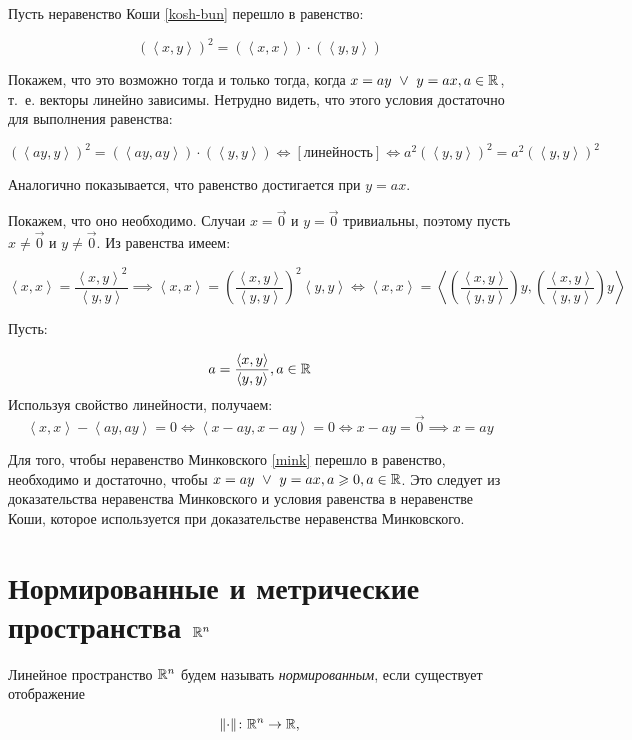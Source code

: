 \documentclass[../../main.tex]{subfiles}
\begin{document}
\begin{eans}
 Пусть неравенство Коши \eqref{kosh-bun} перешло в равенство:

 \[ (\left<x, y\right>)^2 = \left(\left<x, x\right>\right) 
 \cdot \left(\left<y, y\right>\right) \]

 Покажем, что это возможно тогда и только тогда, когда
 $x = ay\ \lor\ y = ax, a \in \mathbb{R}$, т.~е. векторы линейно зависимы.
 Нетрудно видеть, что этого условия достаточно для
 выполнения равенства:

 \[ (\left<ay, y\right>)^2 = \left(\left<ay, ay\right>\right) 
 \cdot \left(\left<y, y\right>\right) \iff \left[
 \text{линейность}\right] \iff a^2 (\left<y, y\right>)^2 = 
 a^2 (\left<y, y\right>)^2 \]
 
 Аналогично показывается, что равенство достигается при $y = ax$.

 Покажем, что оно необходимо. Случаи $x = \vec{0}$ и $y = \vec{0}$
 тривиальны, поэтому пусть $x \neq \vec{0}$ и $y \neq \vec{0}$. 
 Из равенства имеем:

 \[\left<x, x\right> = \frac{\left<x, y\right>^2}{\left<y, y\right>}
 \implies \left<x, x\right> = \left(\frac{\left<x, y\right>}
 {\left<y, y\right>}\right)^2 \left<y, y\right> \iff \left<x, x\right>
 = \left<\left(\frac{\left<x, y\right>}{\left<y, y\right>}\right) y, 
 \left(\frac{\left<x, y\right>}{\left<y, y\right>}\right) y\right> \]

 Пусть:

 \[a = \frac{\left<x, y\right>}{\left<y, y\right>}, a \in \mathbb{R} \]
 Используя свойство линейности, получаем:
 \[\left<x, x\right> - \left<ay, ay\right> = 0 \iff \left<x - ay,
 x - ay\right> = 0 \iff x - ay = \vec{0} \implies x = ay\]

 Для того, чтобы неравенство Минковского \eqref{mink} перешло в
 равенство, необходимо и достаточно, чтобы
 $x = ay\ \lor\ y = ax, a \geqslant 0, a \in \mathbb{R}$.
 Это следует из доказательства неравенства Минковского и условия равенства
 в неравенстве Коши, которое используется при доказательстве
 неравенства Минковского.
\end{eans}

\section{Нормированные и метрические пространства $\mathbb{R}^n$}

Линейное пространство $\mathbb{R}^n$ будем называть 
\emph{нормированным}, если существует отображение

\begin{equation}
 \label{norm-disp}
 \lVert\cdot \rVert\colon \mathbb{R}^n \to \mathbb{R},
\end{equation}
\end{document}
